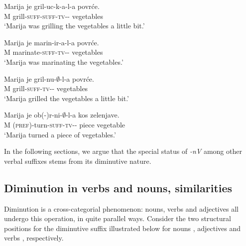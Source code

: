 \documentclass[output=paper,colorlinks,citecolor=brown]{langscibook}
\begin{document}
\ex \gll Marija je gril-uc-k-a-l-a povrće.\\ 
M {\AUX} grill-\textsc{suff-suff-tv}-{\PST-\FEM} vegetables\\ 
\glt `Marija was grilling the vegetables a little bit.'
 \label{str:ex:tanc2-c}

\ex \gll Marija je marin-ir-a-l-a povrće.\\ 
M {\AUX} marinate-\textsc{suff-tv}-{\PST-\FEM} vegetables\\ 
\glt `Marija was marinating the vegetables.'
 \label{str:ex:tanc2-d}

\ex \gll Marija je gril-nu-$∅$-l-a povrće.\\ 
M {\AUX} grill-\textsc{suff-tv}-{\PST-\FEM} vegetables\\ 
\glt `Marija grilled the vegetables a little bit.'
 \label{str:ex:tanc2-e}

\ex \gll Marija je ob(-)r-ni-$∅$-l-a kos zelenjave.\\
M {\AUX} (\textsc{pref})-turn-\textsc{suff-tv}-{\PST-\FEM} piece vegetable\\ 
\glt `Marija turned a piece of vegetables.'
 \label{str:ex:tanc2-f}
\z
\z

\noindent In the following sections, we argue that the special status of \textit{-nV} among other verbal suffixes stems from its diminutive nature.

\subsection{Diminution in verbs and nouns, similarities} \label{str:subsect:Diminution in verbs and nouns}

Diminution is a cross-categorial phenomenon: nouns, verbs and adjectives all undergo this operation, in quite parallel ways. Consider the two structural positions for the diminutive suffix illustrated below for nouns , adjectives  and verbs , respectively. 

    
\end{document}
